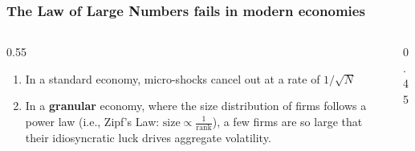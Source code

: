 \documentclass[aspectratio=169,11pt]{beamer}
\begin{document}
\begin{frame} \label{src_sqrtn}
    \frametitle{The Law of Large Numbers fails in modern economies}
    \begin{columns}[T]
        \begin{column}{0.55\textwidth}


            \vspace{0.8cm}
            \begin{enumerate}
                \item {In a standard economy, micro-shocks cancel out at a rate of $1/\sqrt{N}$ \hyperlink{app_sqrtn}{}
                      \vspace{0.4cm}}
                \item {In a \textbf{granular} economy, where the size distribution of firms follows a power law (i.e., Zipf's Law: $\text{size} \propto \frac{1}{\text{rank}}$), a few firms are so large that their idiosyncratic luck drives aggregate volatility.}
            \end{enumerate}
        \end{column}

        \begin{column}{0.45\textwidth}
        \end{column}
    \end{columns}

\end{frame}
\end{document}
